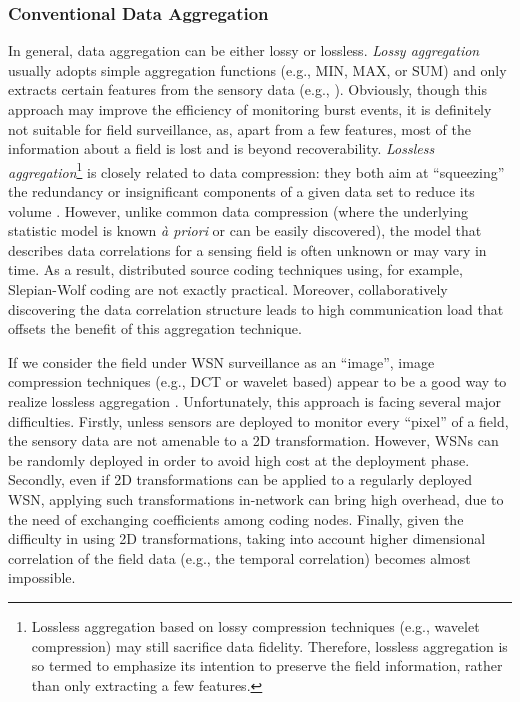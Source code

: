 \documentclass[conference]{IEEEtran}
\begin{document}
    \subsubsection{Conventional Data Aggregation}
In general, data aggregation can be either lossy or lossless. \textit{Lossy aggregation} usually adopts simple aggregation functions (e.g., MIN, MAX, or SUM) and only extracts certain features from the sensory data (e.g., \cite{Madden-OSR02}). Obviously, though this approach may improve the efficiency of monitoring burst events, it is definitely not suitable for field surveillance, as, apart from a few features, most of the information about a field is lost and is beyond recoverability. \textit{Lossless aggregation}\footnote{Lossless aggregation based on lossy compression techniques (e.g., wavelet compression) may still sacrifice data fidelity. Therefore, lossless aggregation is so termed to emphasize its intention to preserve the field information, rather than only extracting a few features.} is closely related to data compression: they both aim at ``squeezing'' the redundancy or insignificant components of a given data set to reduce its volume \cite{Cristescu-ToN06,Gupta-ToSN08}. However, unlike common data compression (where the underlying statistic model is known \textit{\`{a} priori} or can be easily discovered), the model that describes data correlations for a sensing field is often unknown or may vary in time. As a result, distributed source coding techniques \cite{Cristescu-ToN06} using, for example, Slepian-Wolf coding are not exactly practical. Moreover, collaboratively discovering the data correlation structure \cite{Gupta-ToSN08} leads to high communication load that offsets the benefit of this aggregation technique.

      If we consider the field under WSN surveillance as an ``image'', image compression techniques (e.g., DCT or wavelet based) appear to be a good way to realize lossless aggregation \cite{Ciancio-IPSN06}. Unfortunately, this approach is facing several major difficulties. Firstly, unless sensors are deployed to monitor every ``pixel'' of a field, the sensory data are not amenable to a 2D transformation. However, WSNs can be randomly deployed in order to avoid high cost at the deployment phase. Secondly, even if 2D transformations can be applied to a regularly deployed WSN, applying such transformations in-network can bring high overhead, due to the need of exchanging coefficients among coding nodes. Finally, given the difficulty in using 2D transformations, taking into account higher dimensional correlation of the field data (e.g., the temporal correlation) becomes almost impossible.
\end{document}
